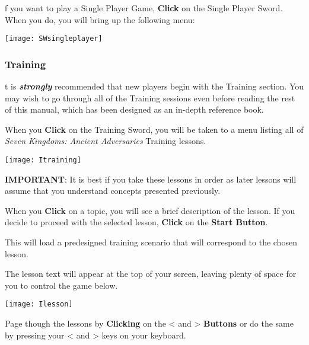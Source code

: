 f you want to play a Single Player Game, \textbf{Click} on the Single Player Sword. When you do, you will bring up the following menu: 

\begin{center}
	\texttt{[image: SWsingleplayer]} %
\end{center}

\subsubsection{\textsf{Training}}


t is \textbf{\textit{strongly}} recommended that new players begin with the Training section. You may wish to go through all of the Training sessions even before reading the rest of this manual, which has been designed as an in-depth reference book.

When you \textbf{Click} on the Training Sword, you will be taken to a menu listing all of \textit{Seven Kingdoms: Ancient Adversaries} Training lessons.

\begin{center}
    \texttt{[image: Itraining]} %
\end{center}

\textbf{IMPORTANT}: It is best if you take these lessons in order as later lessons will assume that you understand concepts presented previously.

When you \textbf{Click} on a topic, you will see a brief description of the lesson. If you decide to proceed with the selected lesson, \textbf{Click} on the \textbf{Start Button}.

This will load a predesigned training scenario that will correspond to the chosen lesson.

The lesson text will appear at the top of your screen, leaving plenty of space for you to control the game below.

\begin{center}
    \texttt{[image: Ilesson]} %
\end{center}

Page though the lessons by \textbf{Clicking} on the \textless \hspace{1pt} and \textgreater \hspace{1pt} \textbf{Buttons} or do the same by pressing your \textless \hspace{1pt} and \textgreater \hspace{1pt} keys on your keyboard.

